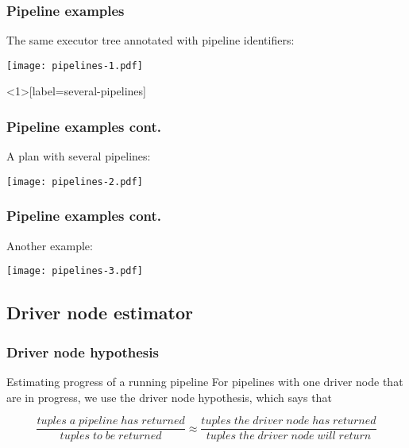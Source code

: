 \documentclass{beamer}
\begin{document}
\begin{frame}
  \frametitle{Pipeline examples}

  The same executor tree annotated with pipeline identifiers:
  \begin{center}
    \texttt{[image: pipelines-1.pdf]}
  \end{center}
\end{frame}

\begin{frame}<1>[label=several-pipelines]
  \frametitle{Pipeline examples cont.}

  A plan with several pipelines:
  \begin{center}
    \texttt{[image: pipelines-2.pdf]}
  \end{center}
\end{frame}

\begin{frame}
  \frametitle{Pipeline examples cont.}

  Another example:
  \begin{center}
    \texttt{[image: pipelines-3.pdf]}
  \end{center}
\end{frame}

\subsection{Driver node estimator}

\begin{frame}
  \frametitle{Driver node hypothesis}

  \begin{block}{Estimating progress of a running pipeline}
    For pipelines with one driver node that are in progress, we use the
    \alert{driver node hypothesis}, which says that

    \bigskip


    \begin{equation*}
      \frac{tuples\;a\;pipeline\;has\;returned}{tuples\;to\;be\;returned} \approx
      \frac{tuples\;the\;driver\;node\;has\;returned}{tuples\;the\;driver\;node\;will\;return}
    \end{equation*}
  \end{block}
\end{frame}
\end{document}
